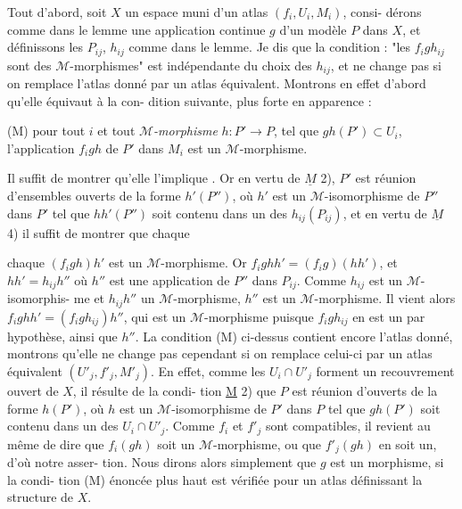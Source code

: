 Tout d'abord, soit $X$ un espace muni d'un atlas $(f_i,U_i,M_i)$, consi-
dérons comme dans le lemme une application continue $g$ d'un modèle $P$
dans $X$, et définissons les $P_{ij}$, $h_{ij}$ comme dans le lemme. Je dis que la
condition : "les $f_i g h_{ij}$ sont des $\mathcal{M}$-morphismes" est indépendante du
choix des $h_{ij}$, et ne change pas si on remplace l'atlas donné par un
atlas équivalent. Montrons en effet d'abord qu'elle équivaut à la con-
dition suivante, plus forte en apparence :

(M) pour tout $i$ et tout \emph{$\mathcal{M}$-morphisme} $h:P' \to P$, tel que $gh(P') \subset U_i$,
l'application $f_i gh$ de $P'$ dans $M_i$ est un $\mathcal{M}$-morphisme.

Il suffit de montrer qu'elle l'implique . Or en vertu de $\underline{M}$ 2), $P'$
est réunion d'ensembles ouverts de la forme $h'(P'')$, où $h'$ est un
$\mathcal{M}$-isomorphisme de $P''$ dans $P'$ tel que $hh'(P'')$ soit contenu dans un
des $h_{ij}(P_{ij})$, et en vertu de $\underline{M}$ 4) il suffit de montrer que chaque

\newpage



chaque $(f_i gh)h'$ est un $\mathcal{M}$-morphisme. Or $f_i ghh' = (f_i g)(hh')$, et $hh'=h_{ij}h''$
où $h''$ est une application de $P''$ dans $P_{ij}$. Comme $h_{ij}$ est un $\mathcal{M}$-isomorphis-
me et $h_{ij}h''$ un $\mathcal{M}$-morphisme, $h''$ est un $\mathcal{M}$-morphisme. Il vient alors
$f_i ghh' = (f_i gh_{ij})h''$, qui est un $\mathcal{M}$-morphisme puisque $f_i gh_{ij}$ en est un
par hypothèse, ainsi que $h''$. La condition (M) ci-dessus contient encore
l'atlas donné, montrons qu'elle ne change pas cependant si on remplace
celui-ci par un atlas équivalent $(U'_j, f'_j, M'_j)$. En effet, comme les
$U_i \cap U'_j$ forment un recouvrement ouvert de $X$, il résulte de la condi-
tion \underline{M} 2) que $P$ est réunion d'ouverts de la forme $h(P')$, où $h$ est un
$\mathcal{M}$-isomorphisme de $P'$ dans $P$ tel que $gh(P')$ soit contenu dans un des
$U_i \cap U'_j$. Comme $f_i$ et $f'_j$ sont compatibles, il revient au même de dire que
$f_i (gh)$ soit un $\mathcal{M}$-morphisme, ou que $f'_j(gh)$ en soit un, d'où notre asser-
tion. Nous dirons alors simplement que $g$ est un morphisme, si la condi-
tion (M) énoncée plus haut est vérifiée pour un atlas définissant la
structure de $X$.

